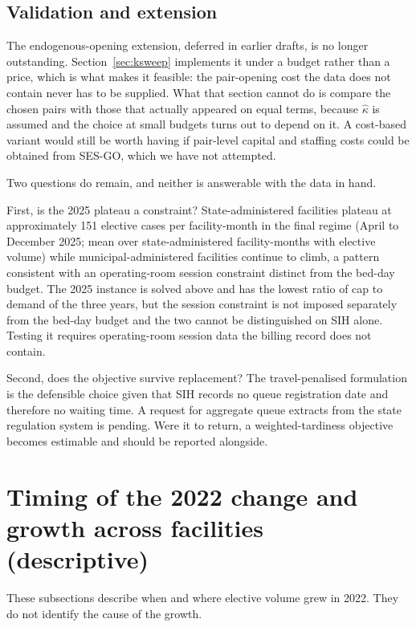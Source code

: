 \subsection{Validation and extension}
\label{sec:extension}

The endogenous-opening extension, deferred in earlier drafts, is no longer
outstanding.
Section~\ref{sec:ksweep} implements it under a budget rather than a price, which
is what makes it feasible: the pair-opening cost the data does not contain never
has to be supplied. What that section cannot do is compare the chosen pairs with
those that actually appeared on equal terms, because $\hat{\kappa}$ is assumed
and the choice at small budgets turns out to depend on it. A cost-based variant
would still be worth having if pair-level capital and staffing costs could be
obtained from SES-GO, which we have not attempted.

Two questions do remain, and neither is answerable with the data in hand.

First, is the 2025 plateau a constraint? State-administered facilities
plateau at approximately 151 elective cases per facility-month in the final regime (April to December 2025; mean over state-administered facility-months with elective volume) while municipal-administered facilities continue to climb, a pattern
consistent with an operating-room session constraint distinct from the bed-day
budget. The 2025 instance is solved above and has the lowest ratio of cap to demand of the three years, but the session constraint is not imposed
separately from the bed-day budget and the two cannot be distinguished on SIH
alone. Testing it requires operating-room session data the billing record does
not contain.

Second, does the objective survive replacement? The travel-penalised formulation
is the defensible choice given that SIH records no queue registration date and
therefore no waiting time. A request for aggregate queue
extracts from the state regulation system is pending. Were it to return, a
weighted-tardiness objective becomes estimable and should be reported alongside.
\section{Timing of the 2022 change and growth across facilities (descriptive)}
\label{app:timing}

These subsections describe when and where elective volume grew in 2022. They do not identify the cause of the growth.

